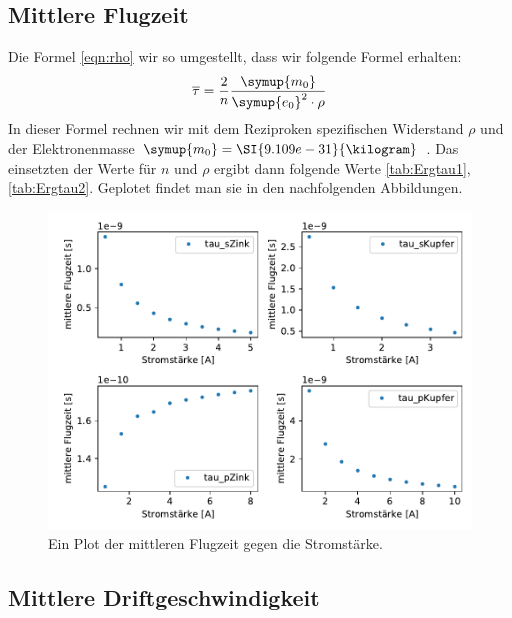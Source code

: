     \subsection{Mittlere Flugzeit}

    
    Die Formel \ref{eqn:rho} wir so umgestellt, dass wir folgende Formel erhalten:
    \begin{equation}
        \overline{\tau} =\frac{2}{n}\frac{\symup{m_0}}{\symup{e_0}^2 \cdot \rho} \nonumber
    \end{equation}
    In dieser Formel rechnen wir mit dem Reziproken  spezifischen Widerstand $\rho$ und der Elektronenmasse
    $\symup{m_0} = \SI{9.109e-31}{\kilogram}$ \cite{m0}. Das einsetzten der Werte für $n$ und $\rho$ ergibt dann folgende Werte \ref{tab:Ergtau1},\ref{tab:Ergtau2}.
    Geplotet findet man sie in den nachfolgenden Abbildungen.

    \begin{figure}[H]
        \centering
        \includegraphics[width=1.1\textwidth]{build/tau.pdf}
        \caption{Ein Plot der mittleren Flugzeit gegen die Stromstärke.}
        \label{img:tau}
    \end{figure}


    \subsection{Mittlere Driftgeschwindigkeit}


